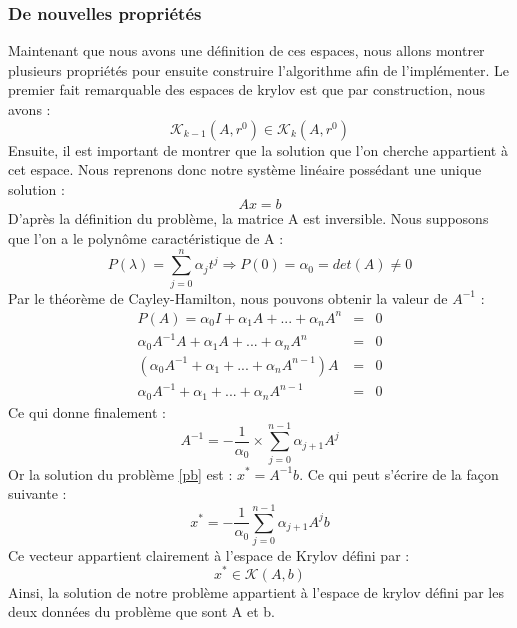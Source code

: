 \subsubsection{De nouvelles propriétés}
Maintenant que nous avons une définition de ces espaces, nous allons montrer plusieurs propriétés pour ensuite construire l'algorithme afin de l'implémenter. Le premier fait remarquable des espaces de krylov est que par construction, nous avons :  
\begin{equation}
\mathcal{K}_{k - 1}(A, r^0) \in \mathcal{K}_k(A, r^0)
\end{equation}
Ensuite, il est important de montrer que la solution que l'on cherche appartient à cet espace. Nous reprenons donc notre système linéaire possédant une unique solution : 
\begin{equation}
Ax = b \label{pb}
\end{equation}
D'après la définition du problème, la matrice A est inversible. Nous supposons que l'on a le polynôme caractéristique de A :
\begin{equation}
P(\lambda) = \sum_{j = 0}^{n} \alpha_j t^j \Rightarrow P(0) = \alpha_0 = det(A) \neq 0
\end{equation}
Par le théorème de Cayley-Hamilton, nous pouvons obtenir la valeur de $A^{-1}$ :
\begin{eqnarray}
P(A) = \alpha_0 I + \alpha_1 A + ... + \alpha_n A^n &=& 0 \\
\alpha_0 A^{-1}A + \alpha_1 A + ... + \alpha_n A^n &=& 0 \\
(\alpha_0 A^{-1} + \alpha_1  + ... + \alpha_n A^{n - 1})A &=& 0 \\
\alpha_0 A^{-1} + \alpha_1  + ... + \alpha_n A^{n - 1} &=& 0
\end{eqnarray}
Ce qui donne finalement :
\begin{equation}
 A^{-1} = - \frac{1}{\alpha_0} \times \sum_{j=0}^{n-1} \alpha_{j+1} A^j
\end{equation}
Or la solution du problème \ref{pb} est : $x^* = A^{-1}b$. Ce qui peut s'écrire de la façon suivante : 
\begin{equation}
x^* = - \frac{1}{\alpha_0} \sum_{j=0}^{n-1} \alpha_{j+1} A^j b
\end{equation}
Ce vecteur appartient clairement à l'espace de Krylov défini par : 
\begin{equation}
x^* \in \mathcal{K}(A, b)
\end{equation}
Ainsi, la solution de notre problème appartient à l'espace de krylov défini par les deux données du problème que sont A et b. 
